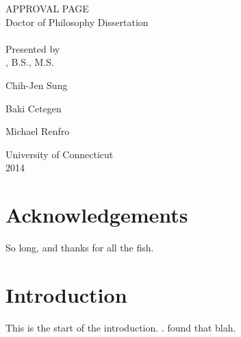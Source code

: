 \documentclass[12pt]{report}
\newcommand{\blankline}{\vspace*{\baselineskip}}
\begin{document}
\setcounter{page}{1}
\begin{center}
APPROVAL PAGE \\
Doctor of Philosophy Dissertation \\
\thetitle \\
\blankline \blankline
Presented by \\
\theauthor, B.S., M.S. \\
\end{center}
\blankline
{}
\vspace{-0.5\baselineskip}
\begin{center}
Chih-Jen Sung
\end{center}
\blankline
{}
\vspace{-0.5\baselineskip}
\begin{center}
Baki Cetegen
\end{center}
\blankline
{}
\vspace{-0.5\baselineskip}
\begin{center}
Michael Renfro
\end{center}
\blankline \blankline \blankline \blankline \blankline
\begin{center}
University of Connecticut \\
2014
\end{center}
\newpage

{} 
\chapter*{Acknowledgements}
So long, and thanks for all the fish.
\newpage

\tableofcontents
\newpage

\setcounter{page}{1}
\chapter{Introduction}
This is the start of the introduction. \cite{Weber2011,Weber2013,Tsujimura2012}. \textcite{Sarathy2013} found that blah.
\printbibliography
\end{document}
